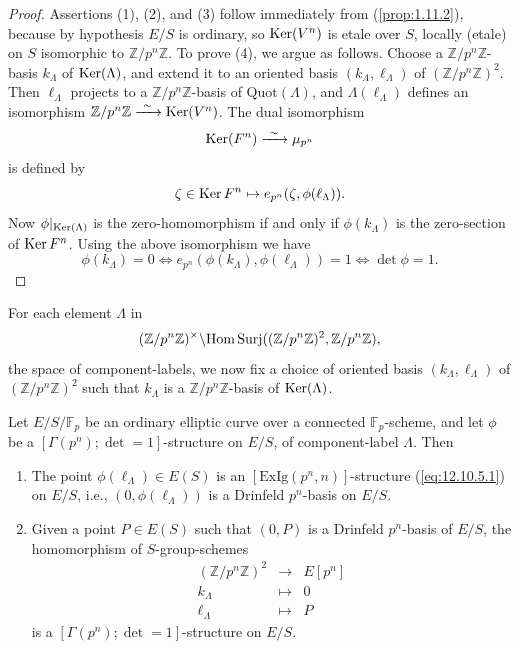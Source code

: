 \begin{proof}
Assertions (1), (2), and (3) follow immediately from (\ref{prop:1.11.2}), because by hypothesis $E/S$ is ordinary, so $\operatorname{Ker}(V^n)$ is etale over $S$, locally (etale) on $S$ isomorphic to $\mathbb{Z}/p^n\mathbb{Z}$. To prove (4), we argue as follows. Choose a $\mathbb{Z}/p^n\mathbb{Z}$-basis $k_\Lambda$ of $\operatorname{Ker}(\Lambda)$, and extend it to an oriented basis $(k_\Lambda, \ell_\Lambda)$ of $(\mathbb{Z}/p^n\mathbb{Z})^2$. Then $\ell_\Lambda$ projects to a $\mathbb{Z}/p^n\mathbb{Z}$-basis of $\mathrm{Quot}(\Lambda)$, and $\Lambda(\ell_\Lambda)$ defines an isomorphism $\mathbb{Z}/p^n\mathbb{Z} \xrightarrow{\ \sim\ } \operatorname{Ker}(V^n)$. The dual isomorphism
\[
\operatorname{Ker}(F^n) \xrightarrow{\ \sim\ } \mu_{p^n}
\]
is defined by
\[
\zeta \in \operatorname{Ker} F^n \mapsto e_{p^n}(\zeta, \phi(\ell_\Lambda)) .
\]
Now $\phi|_{\operatorname{Ker}(\Lambda)}$ is the zero-homomorphism if and only if $\phi(k_\Lambda)$ is the zero-section of $\operatorname{Ker} F^n$. Using the above isomorphism we have
\[
\phi(k_\Lambda) = 0 \iff e_{p^n}(\phi(k_\Lambda), \phi(\ell_\Lambda)) = 1 \iff \det \phi = 1 .
\]
\end{proof}

\kmitem\label{item:13.7.3}For each element $\Lambda$ in
\[
(\mathbb{Z}/p^n\mathbb{Z})^\times \backslash \mathrm{Hom\,Surj}((\mathbb{Z}/p^n\mathbb{Z})^2, \mathbb{Z}/p^n\mathbb{Z}) ,
\]
the space of component-labels, we now fix a choice of oriented basis $(k_\Lambda, \ell_\Lambda)$ of $(\mathbb{Z}/p^n\mathbb{Z})^2$ such that $k_\Lambda$ is a $\mathbb{Z}/p^n\mathbb{Z}$-basis of $\operatorname{Ker}(\Lambda)$.

\begin{kcor}\label{cor:13.7.4}
Let $E/S/\mathbb{F}_p$ be an ordinary elliptic curve over a connected $\mathbb{F}_p$-scheme, and let $\phi$ be a $[\Gamma(p^n); \det = 1]$-structure on $E/S$, of component-label $\Lambda$. Then
\begin{enumerate}[label=(\arabic*), leftmargin=2.4em]
\item The point $\phi(\ell_\Lambda) \in E(S)$ is an $[\mathrm{ExIg}(p^n,n)]$-structure (\ref{eq:12.10.5.1}) on $E/S$, i.e., $(0, \phi(\ell_\Lambda))$ is a Drinfeld $p^n$-basis on $E/S$.
\item Given a point $P \in E(S)$ such that $(0,P)$ is a Drinfeld $p^n$-basis of $E/S$, the homomorphism of $S$-group-schemes
\[
\begin{array}{rcl}
(\mathbb{Z}/p^n\mathbb{Z})^2 & \to & E[p^n] \\
k_\Lambda & \mapsto & 0 \\
\ell_\Lambda & \mapsto & P
\end{array}
\]
is a $[\Gamma(p^n); \det = 1]$-structure on $E/S$.
\end{enumerate}
\end{kcor}

